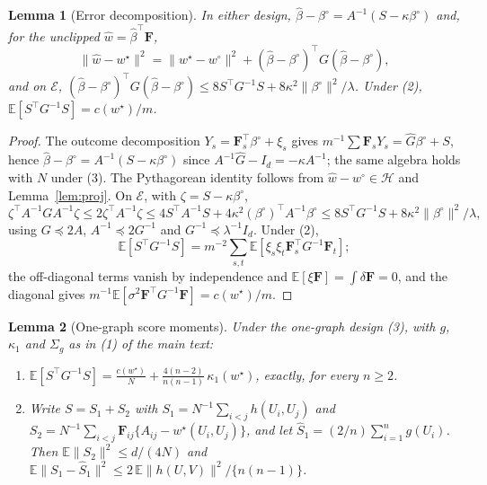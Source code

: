 \documentclass[12pt]{article}
\newcommand{\E}{\mathbb{E}}
\newcommand{\calH}{\mathcal{H}}
\newcommand{\norm}[1]{\|#1\|}
\newcommand{\wstar}{w^{\star}}
\newcommand{\wproj}{w^{\circ}}
\newcommand{\bproj}{\beta^{\circ}}
\newcommand{\what}{\hat w}
\newcommand{\bhat}{\hat\beta}
\newcommand{\Ghat}{\hat G}
\newcommand{\Fv}{\mathbf{F}}
\newtheorem{lemma}{Lemma}
\begin{document}
\begin{lemma}[Error decomposition]
\label{lem:decomp}
In either design, $\bhat-\bproj=A^{-1}(S-\kappa\bproj)$ and, for the unclipped $\what=\bhat^{\top}\Fv$,
\[
\norm{\what-\wstar}^2=\norm{\wstar-\wproj}^2+(\bhat-\bproj)^{\top}G(\bhat-\bproj),
\]
and on $\mathcal{E}$, $(\bhat-\bproj)^{\top}G(\bhat-\bproj)\le8S^{\top}G^{-1}S+8\kappa^2\norm{\bproj}^2/\lambda$. Under (2), $\E[S^{\top}G^{-1}S]=c(\wstar)/m$.
\end{lemma}

\begin{proof}
The outcome decomposition $Y_s=\Fv_s^{\top}\bproj+\xi_s$ gives $m^{-1}\sum\Fv_sY_s=\Ghat\bproj+S$, hence $\bhat-\bproj=A^{-1}(S-\kappa\bproj)$ since $A^{-1}\Ghat-I_d=-\kappa A^{-1}$; the same algebra holds with $N$ under (3). The Pythagorean identity follows from $\what-\wproj\in\calH$ and Lemma~\ref{lem:proj}. On $\mathcal{E}$, with $\zeta=S-\kappa\bproj$,
\[
\zeta^{\top}A^{-1}GA^{-1}\zeta\le2\zeta^{\top}A^{-1}\zeta\le4S^{\top}A^{-1}S+4\kappa^2(\bproj)^{\top}A^{-1}\bproj\le8S^{\top}G^{-1}S+8\kappa^2\norm{\bproj}^2/\lambda,
\]
using $G\preceq2A$, $A^{-1}\preceq2G^{-1}$ and $G^{-1}\preceq\lambda^{-1}I_d$. Under (2),
\[
\E[S^{\top}G^{-1}S]=m^{-2}\textstyle\sum_{s,t}\E[\xi_s\xi_t\Fv_s^{\top}G^{-1}\Fv_t];
\]
the off-diagonal terms vanish by independence and $\E[\xi\Fv]=\int\delta\Fv=0$, and the diagonal gives $m^{-1}\E[\sigma^2\Fv^{\top}G^{-1}\Fv]=c(\wstar)/m$.
\end{proof}

\begin{lemma}[One-graph score moments]
\label{lem:onegraphscore}
Under the one-graph design (3), with $g$, $\kappa_1$ and $\Sigma_g$ as in (1) of the main text:
\begin{enumerate}
\item[(a)] $\displaystyle\E[S^{\top}G^{-1}S]=\frac{c(\wstar)}{N}+\frac{4(n-2)}{n(n-1)}\,\kappa_1(\wstar)$, exactly, for every $n\ge2$.
\item[(b)] Write $S=S_1+S_2$ with $S_1=N^{-1}\sum_{i<j}h(U_i,U_j)$ and $S_2=N^{-1}\sum_{i<j}\Fv_{ij}\{A_{ij}-\wstar(U_i,U_j)\}$, and let $\hat S_1=(2/n)\sum_{i=1}^{n}g(U_i)$. Then $\E\norm{S_2}^2\le d/(4N)$ and $\E\norm{S_1-\hat S_1}^2\le2\,\E\norm{h(U,V)}^2/\{n(n-1)\}$.
\end{enumerate}
\end{lemma}
\end{document}
